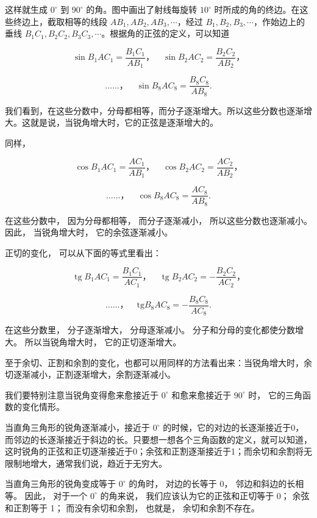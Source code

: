 这样就生成 \(0^{\circ}\) 到 \(90^{\circ}\) 的角。图中画出了射线每旋转
\(10^{\circ}\) 时所成的角的终边。在这些终边上，截取相等的线段
\(AB_{1}, AB_{2}, AB_{3}, \cdots\)，经过
\(B_{1}, B_{2}, B_{3}, \cdots\)，作始边上的垂线
\(B_{1}C_{1}, B_{2}C_{2}, B_{3}C_{3}, \cdots\)。根据角的正弦的定义，可以知道

\[
\sin B _ {1} A C _ {1} = \frac {B _ {1} C _ {1}}{A B _ {1}}\text{，} \quad \sin B _ {2} A C _ {2} = \frac {B _ {2} C _ {2}}{A B _ {2}}\text{，}
\]

\[
\dots \dots \text{，} \quad \sin B _ {8} A C _ {8} = \frac {B _ {8} C _ {8}}{A B _ {8}}.
\]

我们看到，在这些分数中，分母都相等，而分子逐渐增大。所以这些分数也逐渐增大。这就是说，当锐角增大时，它的正弦是逐渐增大的。

同样，

\[
\cos B _ {1} A C _ {1} = \frac {A C _ {1}}{A B _ {1}}\text{，} \quad \cos B _ {2} A C _ {2} = \frac {A C _ {2}}{A B _ {2}}\text{，}
\]

\[
\dots \dots \text{，} \quad \cos B _ {8} A C _ {8} = \frac {A C _ {8}}{A B _ {8}}.
\]

在这些分数中， 因为分母都相等， 而分子逐渐减小，
所以这些分数也逐渐减小。 因此， 当锐角增大时， 它的余弦逐渐减小。

正切的变化， 可以从下面的等式里看出：

\[
\operatorname{tg} B _ {1} A C _ {1} = \frac {B _ {1} C _ {1}}{A C _ {1}}\text{，} \quad \operatorname{tg} B _ {2} A C _ {2} = - \frac {B _ {2} C _ {2}}{A C _ {2}}\text{，}
\]

\[
\dots \dots \text{，} \quad \mathrm{tg} B _ {8} A C _ {8} = - \frac {B _ {8} C _ {8}}{A C _ {8}}.
\]

在这些分数里， 分子逐渐增大， 分母逐渐减小。
分子和分母的变化都使分数增大。 所以当锐角增大时， 它的正切逐渐增大。

至于余切、正割和余割的变化，也都可以用同样的方法看出来：当锐角增大时，余切逐渐减小，正割逐渐增大，余割逐渐减小。

我们要特别注意当锐角变得愈来愈接近于 \(0^{\circ}\) 和愈来愈接近于
\(90^{\circ}\) 时， 它的三角函数的变化情形。

当直角三角形的锐角逐渐减小，接近于 \(0^{\circ}\)
的时候，它的对边的长逐渐接近于0，而邻边的长逐渐接近于斜边的长。只要想一想各个三角函数的定义，就可以知道，这时锐角的正弦和正切逐渐接近于0；余弦和正割逐渐接近于1；而余切和余割将无限制地增大，通常我们说，趋近于无穷大。

当直角三角形的锐角变成等于 \(0^{\circ}\) 的角时， 对边的长等于 0，
邻边和斜边的长相等。 因此， 对于一个 \(0^{\circ}\) 的角来说，
我们应该认为它的正弦和正切等于 0； 余弦和正割等于 1； 而没有余切和余割，
也就是， 余切和余割不存在。

